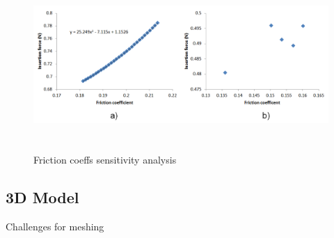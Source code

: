\begin{figure}[h!]	
	\centering
\includegraphics[height=6.5cm]{img/sens.PNG}
   \caption{Friction coeffs sensitivity analysis}
 \label{fgr:PFS}
\end{figure}


\newpage
\subsection{3D Model}
Challenges for meshing



